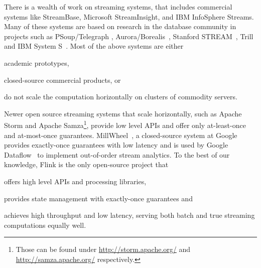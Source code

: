  There is a wealth of work on streaming systems, that includes commercial systems like StreamBase, Microsoft StreamInsight, and IBM InfoSphere Streams. Many of these systems are based on research in the database community in projects such as PSoup/Telegraph \cite{chandrasekaran2003psoup}, Aurora/Borealis~\cite{abadi2005design}, Stanford STREAM~\cite{arasu2004stream}, Trill~\cite{chandramouli2014trill} and IBM System S~\cite{gedik2008spade}. Most of the above systems are either
\begin{inparaenum}[i)]
  \item academic prototypes,
  \item closed-source commercial products, or 
  \item do not scale the computation horizontally on clusters of commodity servers.
\end{inparaenum}
Newer open source streaming systems that scale horizontally, such as Apache Storm and Apache Samza\footnote{Those can be found under \url{http://storm.apache.org/} and \url{http://samza.apache.org/} respectively.}, provide low level APIs and offer only at-least-once and at-most-once guarantees. MillWheel~\cite{akidau2013millwheel}, a closed-source system at Google provides exactly-once guarantees with low latency and is used by Google Dataflow~\cite{akidau2015dataflow} to implement  out-of-order stream analytics. To the best of our knowledge, Flink is the only open-source project that
\begin{inparaenum}[i)]
  \item offers high level APIs and processing libraries,
  \item provides state management with exactly-once guarantees and
  \item achieves high throughput and low latency, serving both batch and true streaming computations equally well.
\end{inparaenum}